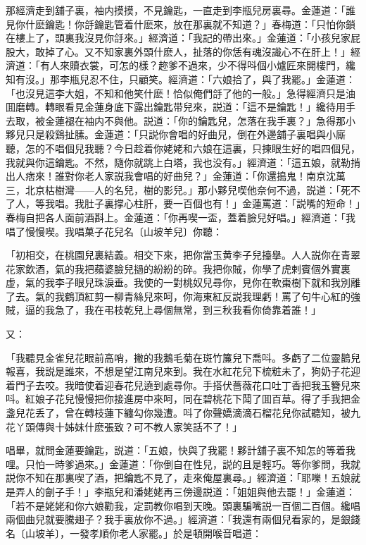 那經濟走到舖子裏，袖内摸摸，不見鑰匙，一直走到李瓶兒房裏尋。金蓮道：「誰見你什麽鑰匙！你㧱鑰匙管着什麽來，放在那裏就不知道？」春梅道：「只怕你鎖在樓上了，頭裏我沒見你㧱來。」經濟道：「我記的帶出來。」金蓮道：「小孩兒家屁股大，敢掉了心。又不知家裏外頭什麽人，扯落的你恁有魂沒識心不在肝上！」經濟道：「有人來贖衣裳，可怎的樣？趂爹不過來，少不得呌個小爐匠來開樓門，纔知有沒。」那李瓶兒忍不住，只顧笑。經濟道：「六娘拾了，與了我罷。」金蓮道：「也沒見這李大姐，不知和他笑什麽！恰似俺們㧱了他的一般。」急得經濟只是油囬磨轉。轉眼看見金蓮身底下露出鑰匙带兒來，説道：「這不是鑰匙！」纔待用手去取，被金蓮褪在袖内不與他。説道：「你的鑰匙兒，怎落在我手裏？」急得那小夥兒只是殺鷄扯膆。金蓮道：「只説你會唱的好曲兒，倒在外邊舖子裏唱與小廝聽，怎的不唱個兒我聽？今日趁着你姥姥和六娘在這裏，只揀眼生好的唱四個兒，我就與你這鑰匙。不然，隨你就跳上白塔，我也没有。」經濟道：「這五娘，就勒掯出人痞來！誰對你老人家説我會唱的好曲兒？」金蓮道：「你還搗鬼！南京沈萬三，北京枯樹灣——人的名兒，樹的影兒。」那小夥兒喫他奈何不過，説道：「死不了人，等我唱。我肚子裏撑心柱肝，要一百個也有！」金蓮罵道：「説嘴的短命！」春梅自把各人面前酒斟上。金蓮道：「你再喫一盃，蓋着臉兒好唱。」經濟道：「我唱了慢慢喫。我唱菓子花兒名〔山坡羊兒〕你聽：

\begin{myquote}
「初相交，在桃園兒裏結義。相交下來，把你當玉黄李子兒擡擧。人人説你在青翠花家飲酒，氣的我把蘋婆臉兒撾的紛紛的碎。我把你賊，你學了虎剌賓個外實裏虚，氣的我李子眼兒珠淚垂。我使的一對桃奴兒尋你，見你在軟棗樹下就和我別離了去。氣的我鶴頂紅剪一柳青絲兒來呵，你海東紅反説我理虧！罵了句牛心紅的強賊，逼的我急了，我在弔枝乾兒上尋個無常，到三秋我看你倚靠着誰！」
\end{myquote}

又：

\begin{myquote}
「我聽見金雀兒花眼前高哨，撇的我鵝毛菊在斑竹簾兒下喬呌。多虧了二位靈鵲兒報喜，我説是誰來，不想是望江南兒來到。我在水紅花兒下梳粧未了，狗奶子花迎着門子去咬。我暗使着迎春花兒遶到處尋你。手搭伏薔薇花口吐丁香把我玉簪兒來呌。紅娘子花兒慢慢把你接進房中來呵，同在碧桃花下鬦了囬百草。得了手我把金盞兒花丢了，曾在轉枝蓮下纏勾你幾遭。呌了你聲嬌滴滴石榴花兒你試聽知，被九花丫頭傳與十姊妹什麽張致？可不教人家笑話不了！」
\end{myquote}

唱畢，就問金蓮要鑰匙，説道：「五娘，快與了我罷！夥計舖子裏不知怎的等着我哩。只怕一時爹過來。」金蓮道：「你倒自在性兒，説的且是輕巧。等你爹問，我就説你不知在那裏喫了酒，把鑰匙不見了，走來俺屋裏尋。」經濟道：「耶嚛！五娘就是弄人的劊子手！」李瓶兒和潘姥姥再三傍邊説道：「姐姐與他去罷！」金蓮道：「若不是姥姥和你六娘勸我，定罰教你唱到天晚。頭裏騙嘴説一百個二百個。纔唱兩個曲兒就要騰翅子？我手裏放你不過。」經濟道：「我還有兩個兒看家的，是銀錢名〔山坡羊〕，一發孝順你老人家罷。」於是頓開喉音唱道：


